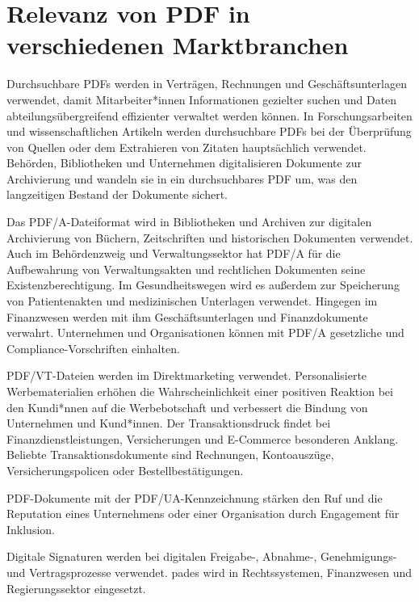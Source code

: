 \section{Relevanz von PDF in verschiedenen Marktbranchen}
Durchsuchbare PDFs werden in Verträgen, Rechnungen und Geschäftsunterlagen verwendet, damit Mitarbeiter*innen Informationen gezielter suchen und Daten abteilungsübergreifend effizienter verwaltet werden können. In Forschungsarbeiten und wissenschaftlichen Artikeln werden durchsuchbare PDFs bei der Überprüfung von Quellen oder dem Extrahieren von Zitaten hauptsächlich verwendet. Behörden, Bibliotheken und Unternehmen digitalisieren Dokumente zur Archivierung und wandeln sie in ein durchsuchbares PDF um, was den langzeitigen Bestand der Dokumente sichert. \cite{adobe-search}

Das PDF/A-Dateiformat wird in Bibliotheken und Archiven zur digitalen Archivierung von Büchern, Zeitschriften und historischen Dokumenten verwendet. Auch im Behördenzweig und Verwaltungssektor hat PDF/A für die Aufbewahrung von Verwaltungsakten und rechtlichen Dokumenten seine Existenzberechtigung. Im Gesundheitswegen wird es außerdem zur Speicherung von Patientenakten und medizinischen Unterlagen verwendet. Hingegen im Finanzwesen werden mit ihm Geschäftsunterlagen und Finanzdokumente verwahrt. Unternehmen und Organisationen können mit PDF/A gesetzliche und Compliance-Vorschriften einhalten. \cite{adobe-pdf-a}

PDF/VT-Dateien werden im Direktmarketing verwendet. Personalisierte Werbematerialien erhöhen die Wahrscheinlichkeit einer positiven Reaktion bei den Kundi*nnen auf die Werbebotschaft und verbessert die Bindung von Unternehmen und Kund*innen. Der Transaktionsdruck findet bei Finanzdienstleistungen, Versicherungen und E-Commerce besonderen Anklang. Beliebte Transaktionsdokumente sind Rechnungen, Kontoauszüge, Versicherungspolicen oder Bestellbestätigungen. \cite{adobe-pdf-vt}

PDF-Dokumente mit der PDF/UA-Kennzeichnung stärken den Ruf und die Reputation eines Unternehmens oder einer Organisation durch Engagement für Inklusion. \cite{adobe-pdf-ua}

Digitale Signaturen werden bei digitalen Freigabe-, Abnahme-, Genehmigungs- und Vertragsprozesse verwendet. \gls{pades} wird in Rechtssystemen, Finanzwesen und Regierungssektor eingesetzt. \cite{adobe-pdf-pades} 